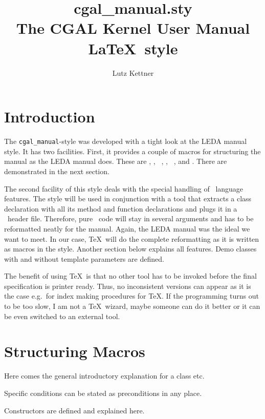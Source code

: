 \documentclass[12pt]{article}
\title {cgal\_manual.sty\\
        The CGAL Kernel User Manual \LaTeX\ style\\
        \vspace{5mm}
        \CCrevision}
\author{Lutz Kettner}
\date{\CCdate}
\begin{document}
\maketitle

\section{Introduction}

The {\tt cgal\_manual}-style was developed with a tight look at the
LEDA manual style. It has two facilities. First, it provides a couple
of macros for structuring the manual as the LEDA manual does. These
are {\tt \string\CCdefinition}, {\tt \string\CCcreation}, {\tt
  \string\CCoperations}, {\tt \string\CCimplementation}, {\tt
  \string\CCexample}, and {\tt \string\CCprecond}. There are demonstrated
in the next section.

The second facility of this style deals with the special handling of
\CC\ language features. The style will be used in conjunction with a
tool that extracts a class declaration with all its method and
function declarations and plugs it in a \CC\ header file. Therefore,
pure \CC\ code will stay in several arguments and has to be
reformatted neatly for the manual. Again, the LEDA manual was the
ideal we want to meet. In our case, \TeX\ will do the complete
reformatting as it is written as macros in the style. Another
section below explains all features. Demo classes with and without
template parameters are defined.

The benefit of using \TeX\ is that no other tool has to be invoked
before the final specification is printer ready. Thus, no inconsistent
versions can appear as it is the case e.g.\ for index making
procedures for \TeX. If the programming turns out to be too slow, I am
not a \TeX\ wizard, maybe someone can do it better or it can be even
switched to an external tool.

\section{Structuring Macros}

\CCdefinition Here comes the general introductory explanation for a
class etc.

\CCprecond Specific conditions can be stated as preconditions in any place.

\CCcreation Constructors are defined and explained here.
\end{document}
